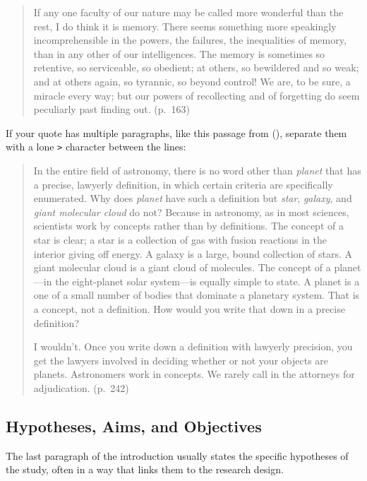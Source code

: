 \documentclass[
  letterpaper,
  DIV=11,
  numbers=noendperiod,
  oneside]{scrartcl}
\begin{document}
\begin{quote}
If any one faculty of our nature may be called more wonderful than the
rest, I do think it is memory. There seems something more speakingly
incomprehensible in the powers, the failures, the inequalities of
memory, than in any other of our intelligences. The memory is sometimes
so retentive, so serviceable, so obedient; at others, so bewildered and
so weak; and at others again, so tyrannic, so beyond control! We are, to
be sure, a miracle every way; but our powers of recollecting and of
forgetting do seem peculiarly past finding out. (p.~163)
\end{quote}

If your quote has multiple paragraphs, like this passage from
(),
separate them with a lone \texttt{\textgreater{}} character between the
lines:

\begin{quote}
In the entire field of astronomy, there is no word other than
\emph{planet} that has a precise, lawyerly definition, in which certain
criteria are specifically enumerated. Why does \emph{planet} have such a
definition but \emph{star}, \emph{galaxy}, and \emph{giant molecular
cloud} do not? Because in astronomy, as in most sciences, scientists
work by concepts rather than by definitions. The concept of a star is
clear; a star is a collection of gas with fusion reactions in the
interior giving off energy. A galaxy is a large, bound collection of
stars. A giant molecular cloud is a giant cloud of molecules. The
concept of a planet---in the eight-planet solar system---is equally
simple to state. A planet is a one of a small number of bodies that
dominate a planetary system. That is a concept, not a definition. How
would you write that down in a precise definition?

I wouldn't. Once you write down a definition with lawyerly precision,
you get the lawyers involved in deciding whether or not your objects are
planets. Astronomers work in concepts. We rarely call in the attorneys
for adjudication. (p.~242)
\end{quote}

\subsection{Hypotheses, Aims, and
Objectives}\label{hypotheses-aims-and-objectives}

The last paragraph of the introduction usually states the specific
hypotheses of the study, often in a way that links them to the research
design.
\end{document}
